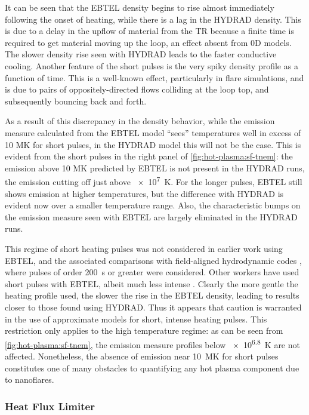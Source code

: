 It can be seen that the EBTEL density begins to rise almost immediately following the onset of heating, while there is a lag in the HYDRAD density. This is due to a delay in the upflow of material from the TR because a finite time is required to get material moving up the loop, an effect absent from 0D models. The slower density rise seen with HYDRAD leads to the faster conductive cooling. Another feature of the short pulses is the very spiky density profile as a function of time. This is a well-known effect, particularly in flare simulations, and is due to pairs of oppositely-directed flows colliding at the loop top, and subsequently bouncing back and forth.

As a result of this discrepancy in the density behavior, while the emission measure calculated from the EBTEL model ``sees'' temperatures well in excess of 10 MK for short pulses, in the HYDRAD model this will not be the case. This is evident from the short pulses in the right panel of \autoref{fig:hot-plasma:sf-tnem}: the emission above 10 MK predicted by EBTEL is not present in the HYDRAD runs, the emission cutting off just above \SI{e7}{\kelvin}. For the longer pulses, EBTEL still shows emission at higher temperatures, but the difference with HYDRAD is evident now over a smaller temperature range. Also, the characteristic bumps on the emission measure seen with EBTEL are largely eliminated in the HYDRAD runs.

This regime of short heating pulses was not considered in earlier work using EBTEL, and the associated comparisons with field-aligned hydrodynamic codes \citep{klimchuk_highly_2008,cargill_enthalpy-based_2012}, where pulses of order \SI{200}{\second} or greater were considered. Other workers have used short pulses with EBTEL, albeit much less intense \citep{tajfirouze_euv_2016,tajfirouze_time-resolved_2016}. Clearly the more gentle the heating profile used, the slower the rise in the EBTEL density, leading to results closer to those found using HYDRAD. Thus it appears that caution is warranted in the use of approximate models for short, intense heating pulses. This restriction only applies to the high temperature regime: as can be seen from \autoref{fig:hot-plasma:sf-tnem}, the emission measure profiles below \SI{e6.8}{\kelvin} are not affected. Nonetheless, the absence of emission near \SI{10}{\mega\kelvin} for short pulses constitutes one of many obstacles to quantifying any hot plasma component due to nanoflares.

\subsubsection{Heat Flux Limiter}\label{hot-plasma:subsubsec:hf_res}

